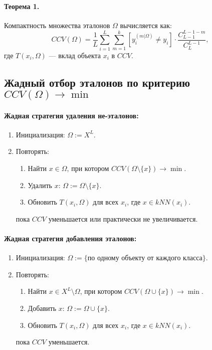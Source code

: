 \paragraph{Теорема 1.} Компактность множества эталонов \( \Omega \) вычисляется как:
\[
CCV(\Omega) = \frac{1}{L} \sum_{i=1}^L \sum_{m=1}^k \left[ y_i^{(m|\Omega)} \neq y_i \right] \cdot \frac{C_{L-1}^{L-1-m}}{C_L^{L-1}},
\]
где \( T(x_i, \Omega) \) — вклад объекта \( x_i \) в \( CCV \).


\subsection*{Жадный отбор эталонов по критерию $CCV(\Omega) \to \min$}

\paragraph{Жадная стратегия удаления не-эталонов:}
\begin{enumerate}
    \item Инициализация: $\Omega := X^L$.
    \item Повторять:
    \begin{enumerate}
        \item Найти $x \in \Omega$, при котором $CCV(\Omega \setminus \{x\}) \to \min$.
        \item Удалить $x$: $\Omega := \Omega \setminus \{x\}$.
        \item Обновить $T(x_i, \Omega)$ для всех $x_i$, где $x \in kNN(x_i)$.
    \end{enumerate}
    пока $CCV$ уменьшается или практически не увеличивается.
\end{enumerate}

\paragraph{Жадная стратегия добавления эталонов:}
\begin{enumerate}
    \item Инициализация: $\Omega := \{\text{по одному объекту от каждого класса}\}$.
    \item Повторять:
    \begin{enumerate}
        \item Найти $x \in X^L \setminus \Omega$, при котором $CCV(\Omega \cup \{x\}) \to \min$.
        \item Добавить $x$: $\Omega := \Omega \cup \{x\}$.
        \item Обновить $T(x_i, \Omega)$ для всех $x_i$, где $x \in kNN(x_i)$.
    \end{enumerate}
    пока $CCV$ уменьшается.
\end{enumerate}

